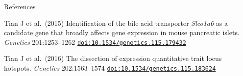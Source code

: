 \documentclass[aspectratio=169,12pt,t]{beamer}
\begin{document}
\begin{frame}{References}

\bbi

\item Tian J et al.\ (2015) Identification of the bile acid transporter \emph{Slco1a6\/} as a
candidate gene that broadly affects gene expression in mouse
pancreatic islets. \emph{Genetics\/} 201:1253--1262
\href{https://doi.org/10.1534/genetics.115.179432}{\tt doi:10.1534/genetics.115.179432}


\item Tian J et al.\ (2016) The dissection of expression quantitative trait
locus hotspots. \emph{Genetics\/} 202:1563--1574
\href{https://doi.org/10.1534/genetics.115.183624}{\tt doi:10.1534/genetics.115.183624}

  \ei


\end{frame}
\end{document}
